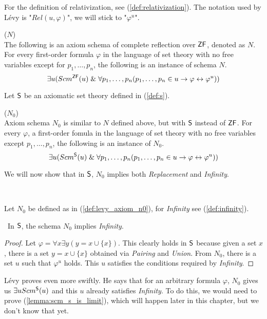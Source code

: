 For the definition of relativization, see (\ref{def:relativization}). The notation used by Lévy is "$Rel(u, \varphi)$", we will stick to "$\varphi^{u}$".
\begin{definition}{($N$)}\label{def:levy_axiom_n}\\
The following is an axiom schema of complete reflection over $\sf{ZF}$, denoted as $N$. For every first-order formula $\varphi$ in the language of set theory with no free variables except for $p_1, \ldots , p_n$, the following is an instance of schema $N$.
\begin{equation}
\exists u (Scm^{\sf{ZF}}(u) \mathrel{\&} \forall p_1, \ldots , p_n (p_1, \ldots , p_n \in u \rightarrow \varphi \leftrightarrow \varphi^{u}))
\end{equation}
\end{definition}

Let $\sf{S}$ be an axiomatic set theory defined in (\ref{def:s}). 

\begin{definition}{($N_0$)}\label{def:levy_axiom_n0}\\
Axiom schema $N_0$ is similar to $N$ defined above, but with $\sf{S}$ instead of $\sf{ZF}$. For every $\varphi$, a first-order fomula in the language of set theory with no free variables except $p_1, \ldots , p_n$, the following is an instance of $N_0$.
\begin{equation}
\exists u (Scm^{\sf{S}}(u) \mathrel{\&} \forall p_1, \ldots , p_n (p_1, \ldots , p_n \in u \rightarrow \varphi \leftrightarrow \varphi^{u}))
\end{equation}
\end{definition}

We will now show that in $\sf{S}$, $N_0$ implies both \emph{Replacement} and \emph{Infinity}.

\

Let $N_0$ be defined as in (\ref{def:levy_axiom_n0}), for \emph{Infinity} see (\ref{def:infinity}).
\begin{theorem}\label{theorem:n0_implies_infinity}\
In $\sf{S}$, the schema $N_0$ implies \emph{Infinity}.
\end{theorem}

\begin{proof} %
Let $\varphi = \forall x \exists y (y = x \cup \{x\})$. 
This clearly holds in $\sf{S}$ because given a set $x$, there is a set $y = x \cup \{x\}$ obtained via \emph{Pairing} and \emph{Union}. %
From $N_0$, there is a set $u$ such that $\varphi^{u}$ holds. This $u$ satisfies the conditions required by \emph{Infinity}.
\end{proof}
Lévy proves even more swiftly. He says that for an arbitrary formula $\varphi$, $N_0$ gives us $\exists u Scm^{\sf{S}}(u)$ and this $u$ already satisfies \emph{Infinity}. To do this, we would need to prove (\ref{lemma:scm_s_is_limit}), which will happen later in this chapter, but we don't know that yet. %

